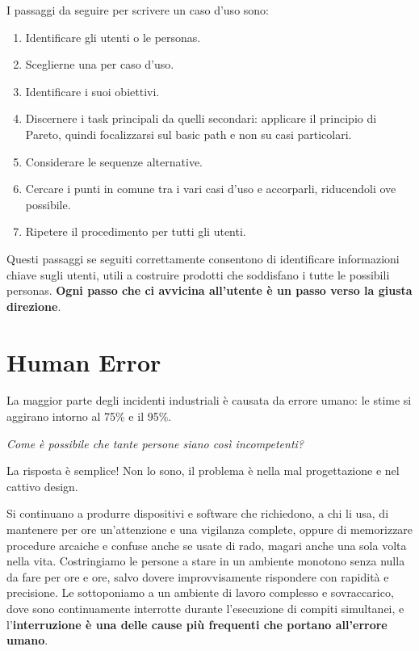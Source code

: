 \documentclass[a4paper,11pt,oneside]{book}
\begin{document}
I passaggi da seguire per scrivere un caso d'uso sono:

\begin{multicols}{2}


	\begin{enumerate}
		\item Identificare gli utenti o le personas.
		\item Sceglierne una per caso d'uso.
		\item Identificare i suoi obiettivi.
		\item Discernere i task principali da quelli secondari: applicare il principio di Pareto, quindi focalizzarsi sul basic path e non su casi particolari.
		\item Considerare le sequenze alternative.
		\item Cercare i punti in comune tra i vari casi d'uso e accorparli, riducendoli ove possibile.
		\item Ripetere il procedimento per tutti gli utenti.
	\end{enumerate}
\end{multicols}

Questi passaggi se seguiti correttamente consentono di identificare informazioni chiave sugli utenti, utili a costruire prodotti che soddisfano i tutte le possibili personas. \textbf{Ogni passo che ci avvicina all'utente è un passo verso la giusta direzione}.

\pagebreak

\chapter{Human Error}

La maggior parte degli incidenti industriali è causata da errore umano:
le stime si aggirano intorno al 75\% e il 95\%.

\begin{flushleft}
	\textit{Come è possibile che tante persone siano così incompetenti?}
\end{flushleft}

La risposta è semplice! Non lo sono, il problema è nella mal progettazione e nel cattivo design.

Si continuano a produrre dispositivi e software che richiedono, a chi li usa, di mantenere per ore un'attenzione e una vigilanza complete, oppure di memorizzare procedure arcaiche e confuse anche se usate di rado, magari anche una sola volta nella vita. Costringiamo le persone a stare in un ambiente monotono senza nulla da fare per ore e ore, salvo dovere improvvisamente rispondere con rapidità e precisione. Le sottoponiamo a un ambiente di lavoro complesso e sovraccarico, dove sono continuamente interrotte durante l'esecuzione di compiti simultanei, e l'\textbf{interruzione è una delle cause più frequenti che portano all'errore umano}.
\end{document}
